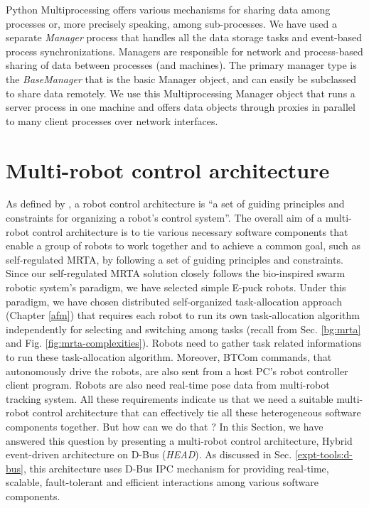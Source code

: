Python Multiprocessing offers various mechanisms for sharing data among processes or, more precisely speaking, among sub-processes. We have used a separate {\em Manager} process that handles all the data storage tasks and event-based process synchronizations.  Managers are responsible for network and process-based sharing of data between processes (and machines).
 The primary manager type is the {\em BaseManager} that is the basic Manager object, and can easily be subclassed to share
 data remotely.  We use this Multiprocessing Manager object that runs a server process in one machine and offers data objects through proxies in parallel to many client  processes over network interfaces.
\section{Multi-robot control architecture}
\label{expt-tools:arch}
As defined by \cite{Mataric2007}, a robot control architecture is ``a set of guiding principles and constraints for organizing a robot's control system''. The overall aim of a multi-robot control architecture is to tie various necessary software components that enable a group of robots to work together and to achieve a common goal, such as self-regulated MRTA, by following a set of guiding principles and constraints. Since our  self-regulated MRTA solution closely follows the bio-inspired swarm robotic system's paradigm, we have selected simple E-puck robots.  Under this paradigm, we have chosen distributed self-organized task-allocation approach (Chapter \ref{afm}) that requires each robot to run its own task-allocation algorithm independently for selecting and switching among tasks (recall from Sec. \ref{bg:mrta} and Fig. \ref{fig:mrta-complexities}).  Robots need to gather task related informations to run these  task-allocation algorithm. Moreover, BTCom  commands, that autonomously drive the robots, are also sent from a host PC's robot controller client program. Robots are also need real-time pose data from multi-robot tracking system. All these requirements indicate us that we need a suitable multi-robot control architecture that can effectively tie all these heterogeneous software components together.  But how can we do that ? In this Section, we have answered this question by presenting a multi-robot control architecture, Hybrid event-driven architecture on D-Bus ({\em HEAD}).  As discussed in Sec. \ref{expt-tools:d-bus}, this architecture uses D-Bus IPC mechanism for providing real-time, scalable, fault-tolerant and efficient interactions among various software components.
